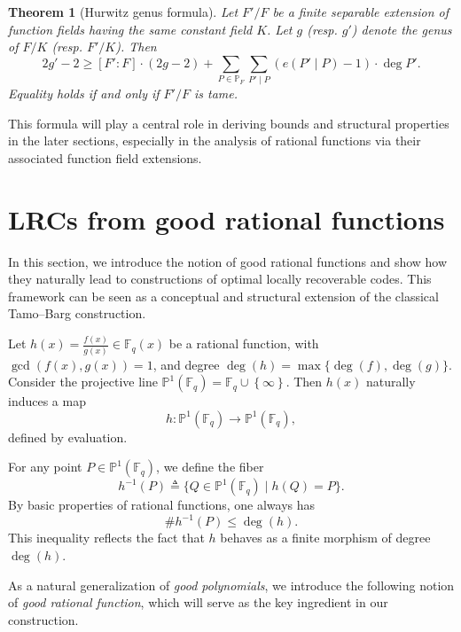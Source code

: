 \documentclass[1p,final]{elsarticle}
\newtheorem{theorem}{Theorem}[section]
\newtheorem{open problem}[theorem]{Open Problem}
\begin{document}
\begin{theorem}[Hurwitz genus formula]
	Let $F'/F$ be a finite separable extension of function fields having the same constant field $K$. Let $g$ (resp. $g'$) denote the genus of $F/K$ (resp. $F'/K$). Then
	\[
	2g'-2 \geq [F' : F] \cdot (2g-2) + \sum_{P \in \mathbb{P}_F} \sum_{P' \mid P} (e(P' \mid P)-1) \cdot \deg P'.
	\]
	Equality holds if and only if $F'/F$ is tame.
\end{theorem}

This formula will play a central role in deriving bounds and structural properties in the later sections, especially in the analysis of rational functions via their associated function field extensions.


\section{LRCs from good rational functions}\label{LRCs from good rational functions}

In this section, we introduce the notion of good rational functions and show how they naturally lead to constructions of optimal locally recoverable codes. This framework can be seen as a conceptual and structural extension of the classical Tamo--Barg construction.

\medskip

Let $h(x)=\displaystyle\frac{f(x)}{g(x)}\in \mathbb{F}_q(x)$ be a rational function, with $\gcd(f(x),g(x))=1$, and degree $\deg(h)=\max\{\deg(f), \deg(g)\}$. Consider the projective line $\mathbb{P}^{1}(\mathbb{F}_{q})=\mathbb{F}_{q}\cup \left \{ \infty  \right \}$. Then $h(x)$ naturally induces a map
\[
h : \mathbb{P}^1(\mathbb{F}_q) \to \mathbb{P}^1(\mathbb{F}_q),
\]
defined by evaluation.

For any point $P \in \mathbb{P}^1(\mathbb{F}_q)$, we define the fiber
\[
h^{-1}(P) \triangleq \{ Q \in \mathbb{P}^1(\mathbb{F}_q) \mid h(Q) = P \}.
\]
By basic properties of rational functions, one always has
\[
\# h^{-1}(P) \leq \deg(h).
\]
This inequality reflects the fact that $h$ behaves as a finite morphism of degree $\deg(h)$.

\medskip

As a natural generalization of \emph{good polynomials}, we introduce the following notion of \emph{good rational function}, which will serve as the key ingredient in our construction.
\end{document}
